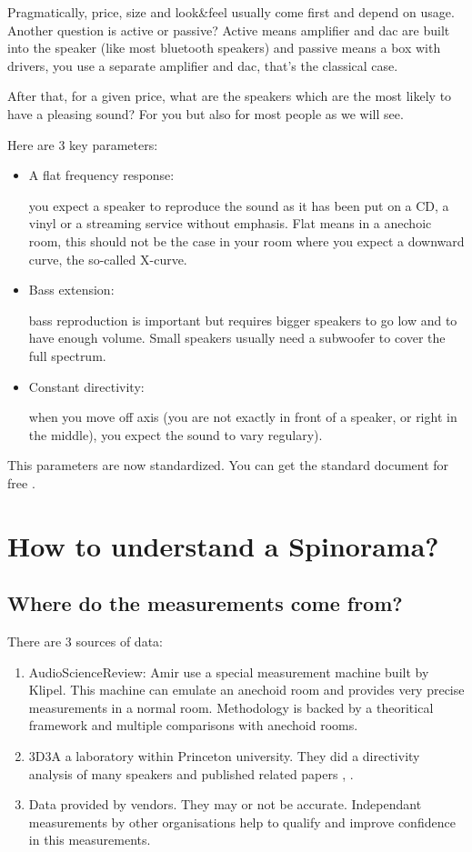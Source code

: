 \documentclass{tufte-book}
\begin{document}
Pragmatically, price, size and look\&feel usually come first and depend on usage. Another question is
active or passive? Active means amplifier and dac are built into the speaker (like most bluetooth speakers)
and passive means a box with drivers, you use a separate amplifier and dac, that's the classical case.

After that, for a given price, what are the speakers which are the most likely to have a pleasing sound? For you
but also for most people as we will see.

Here are 3 key parameters:
\begin{itemize}
\item A flat frequency response:

  you expect a speaker to reproduce the sound as it has been put on a CD, a vinyl or a streaming service
  without emphasis. Flat means in a anechoic room, this should not be the case in your room where you expect
  a downward curve, the so-called X-curve.
\item Bass extension:

  bass reproduction is important but requires bigger speakers to go low and to have enough volume. Small speakers
  usually need a subwoofer to cover the full spectrum.
\item Constant directivity:

  when you move off axis (you are not exactly in front of a speaker, or right in the middle), you expect the sound
  to vary regulary).
\end{itemize}

This parameters are now standardized. You can get the standard document for free \cite{CEA2034}.

\chapter{How to understand a Spinorama?}

\section{Where do the measurements come from?}
There are 3 sources of data:
\begin{enumerate}
\item AudioScienceReview: Amir use a special measurement machine built by Klipel. This machine can emulate
  an anechoid room and provides very precise measurements in a normal room. Methodology is backed by a
  theoritical framework \cite{Klippel2016} and multiple comparisons with anechoid rooms.
\item 3D3A a laboratory within Princeton university. They did a directivity analysis of many speakers \cite{Tylka2015}
  and published related papers \cite{Tylka2015}, \cite{Tylka2014}.
\item Data provided by vendors. They may or not be accurate. Independant measurements by other organisations
  help to qualify and improve confidence in this measurements.
\end{enumerate}
\end{document}

